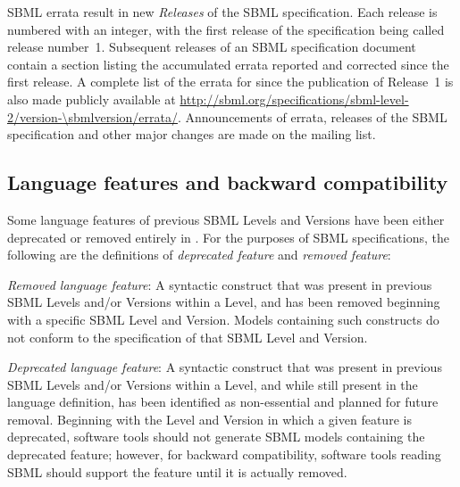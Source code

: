 SBML errata result in new \emph{Releases} of the SBML
specification.  Each release is numbered with an integer, with the
first release of the specification being called release number~1.
Subsequent releases of an SBML specification document contain a
section listing the accumulated errata reported and corrected
since the first release.  A complete list of the errata for
\sbmltwothree since the publication of Release~1 is also
made publicly available at
\url{http://sbml.org/specifications/sbml-level-2/version-\sbmlversion/errata/}.
Announcements of errata, releases of the SBML specification
and other major changes are made on the
 mailing
list.


\subsection{Language features and backward compatibility}
\label{sec:deprecated-features}

Some language features of previous SBML Levels and Versions have
been either deprecated or removed entirely in \sbmltwothree.  For
the purposes of SBML specifications, the following are the
definitions of \emph{deprecated feature} and \emph{removed
  feature}:
\begin{description}
  
\item \emph{Removed language feature}: A syntactic construct that
  was present in previous SBML Levels and/or Versions within a
  Level, and has been removed beginning with a specific SBML Level
  and Version.  Models containing such constructs do not conform
  to the specification of that SBML Level and Version.
  
\item \emph{Deprecated language feature}: A syntactic construct
  that was present in previous SBML Levels and/or Versions within
  a Level, and while still present in the language definition, has
  been identified as non-essential and planned for future removal.
  Beginning with the Level and Version in which a given feature is
  deprecated, software tools should not generate SBML models
  containing the deprecated feature; however, for backward
  compatibility, software tools reading SBML should support the
  feature until it is actually removed.

\end{description}

